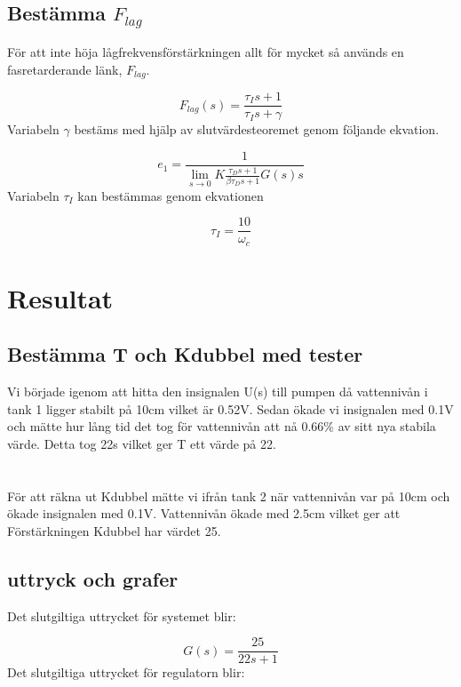 \documentclass[a4paper]{article}
\begin{document}
\subsection{Bestämma $F_{lag}$}

För att inte höja lågfrekvensförstärkningen allt för mycket så används en fasretarderande länk, $F_{lag}$.

\begin{equation}
  F_{lag}(s)=\frac{\tau_Is+1}{\tau_Is+\gamma}
\end{equation}
Variabeln $\gamma$ bestäms med hjälp av slutvärdesteoremet genom följande ekvation.

\begin{equation}
  e_1=\frac{1}{\lim_{s \to 0}K\frac{\tau_Ds+1}{\beta\tau_Ds+1}G(s)s}
\end{equation}
Variabeln $\tau_I$ kan bestämmas genom ekvationen

\begin{equation}
  \tau_I=\frac{10}{\omega_c}
\end{equation}

\section{Resultat}

\subsection{Bestämma T och Kdubbel med tester}
Vi började igenom att hitta den insignalen U(s) till pumpen då vattennivån i tank 1 ligger stabilt på 10cm vilket är 0.52V. Sedan ökade vi insignalen med 0.1V och mätte hur lång tid det tog för vattennivån att nå 0.66\% av sitt nya stabila värde. Detta tog 22s vilket ger T ett värde på 22. \\
\\\\
För att räkna ut Kdubbel mätte vi ifrån tank 2 när vattennivån var på 10cm och ökade insignalen med 0.1V. Vattennivån ökade med 2.5cm vilket ger att Förstärkningen Kdubbel har värdet 25.

\subsection{uttryck och grafer}
Det slutgiltiga uttrycket för systemet blir:

\begin{equation*}
  G(s)=\frac{25}{22s+1}
\end{equation*}
Det slutgiltiga uttrycket för regulatorn blir:
\end{document}
